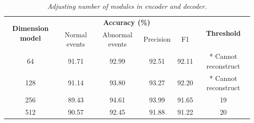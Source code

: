 \begin{table}[H]
  \begin{center}
    \caption[Adjusting number of modules in encoder and decoder.]{\emph{Adjusting number of modules in encoder and decoder.} \hspace{\textwidth}}\label{tab:tran1t}
    \begin{tabular}{c c c c c c c}
      \hline
      \multicolumn{2}{c}{\multirow{2}{*}{\textbf{Dimension model}}} & \multicolumn{4}{c}{\textbf{Accuracy (\%)}} & \multirow{2}{*}{\textbf{Threshold}}                                                        \\
      \cline{3-6}
                                                                    &                                            & Normal events                       & Abnormal events & Precision & F1                   & \\
      \hline
      \multicolumn{2}{c}{  64 }                                     & 91.71                                      & 92.99                               & 92.51           & 92.11     & * Cannot reconstruct   \\
      \multicolumn{2}{c}{ 128 }                                     & 91.14                                      & 93.80                               & 93.27           & 92.20     & * Cannot reconstruct   \\
      \multicolumn{2}{c}{ 256 }                                     & 89.43                                      & 94.61                               & 93.99           & 91.65     & 19                     \\
      \multicolumn{2}{c}{ 512 }                                     & 90.57                                      & 92.45                               & 91.88           & 91.22     & 20                     \\
      \hline
    \end{tabular}
  \end{center}
\end{table}


